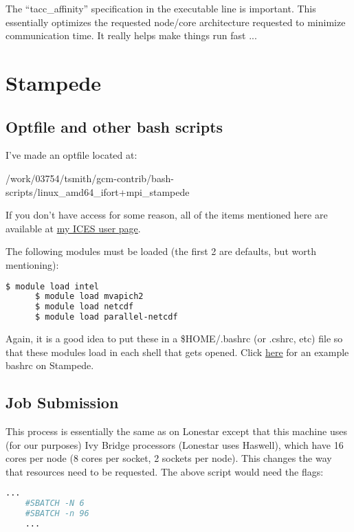 \documentclass[a4paper,11pt]{article}
\begin{document}
	The ``tacc\_affinity'' specification in the executable line is important. This essentially optimizes the requested node/core architecture requested to minimize communication time. It really helps make things run fast ...



\section{Stampede}

	\subsection{Optfile and other bash scripts}
	
	I've made an optfile located at: 
	
	/work/03754/tsmith/gcm-contrib/bash-scripts/linux\_amd64\_ifort+mpi\_stampede

	If you don't have access for some reason, all of the items mentioned here are available at \href{http://users.ices.utexas.edu/~tsmith/bash-scripts/}{my ICES user page}.

	The following modules must be loaded (the first 2 are defaults, but worth mentioning): 

	\begin{lstlisting}[language=bash]
	  $ module load intel
	  $ module load mvapich2
	  $ module load netcdf
	  $ module load parallel-netcdf
	\end{lstlisting}

	Again, it is a good idea to put these in a \$HOME/.bashrc (or .cshrc, etc) file so that these modules load in each shell that gets opened. Click \href{http://users.ices.utexas.edu/~tsmith/bash-scripts/bashrc_tsmith_stampede}{here} for an example bashrc on Stampede.


	\subsection{Job Submission}

	This process is essentially the same as on Lonestar except that this machine uses (for our purposes) Ivy Bridge processors (Lonestar uses Haswell), which have 16 cores per node (8 cores per socket, 2 sockets per node). This changes the way that resources need to be requested. The above script would need the flags: 

	\begin{lstlisting}[language=bash]
	...
	#SBATCH -N 6
	#SBATCH -n 96
	...

	\end{lstlisting} 
\end{document}
